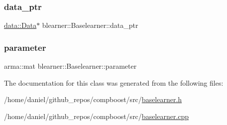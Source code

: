 \mbox{\label{classblearner_1_1_baselearner_a5b5cfab411ff94a13bcce4ca0dd4e507}} 
\subsubsection{\texorpdfstring{data\+\_\+ptr}{data\_ptr}}
{\footnotesize\ttfamily \hyperlink{classdata_1_1_data}{data\+::\+Data}$\ast$ blearner\+::\+Baselearner\+::data\+\_\+ptr\hspace{0.3cm}{\ttfamily [protected]}}

\mbox{\label{classblearner_1_1_baselearner_a56e401f574b274d65e364493277f3247}} 
\subsubsection{\texorpdfstring{parameter}{parameter}}
{\footnotesize\ttfamily arma\+::mat blearner\+::\+Baselearner\+::parameter\hspace{0.3cm}{\ttfamily [protected]}}



The documentation for this class was generated from the following files\+:\begin{DoxyCompactItemize}
\item 
/home/daniel/github\+\_\+repos/compboost/src/\hyperlink{baselearner_8h}{baselearner.\+h}\item 
/home/daniel/github\+\_\+repos/compboost/src/\hyperlink{baselearner_8cpp}{baselearner.\+cpp}\end{DoxyCompactItemize}
